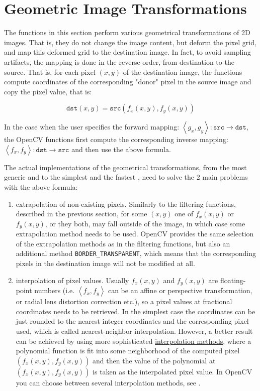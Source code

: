 \section{Geometric Image Transformations}

The functions in this section perform various geometrical transformations of 2D images. That is, they do not change the image content, but deform the pixel grid, and map this deformed grid to the destination image. In fact, to avoid sampling artifacts, the mapping is done in the reverse order, from destination to the source. That is, for each pixel $(x, y)$ of the destination image, the functions compute coordinates of the corresponding "donor" pixel in the source image and copy the pixel value, that is:

\[\texttt{dst}(x,y)=\texttt{src}(f_x(x,y), f_y(x,y))\]

In the case when the user specifies the forward mapping: $\left<g_x, g_y\right>: \texttt{src} \rightarrow \texttt{dst}$, the OpenCV functions first compute the corresponding inverse mapping: $\left<f_x, f_y\right>: \texttt{dst} \rightarrow \texttt{src}$ and then use the above formula.

The actual implementations of the geometrical transformations, from the most generic  and to the simplest and the fastest , need to solve the 2 main problems with the above formula:
\begin{enumerate}
    \item extrapolation of non-existing pixels. Similarly to the filtering functions, described in the previous section, for some $(x,y)$ one of $f_x(x,y)$ or $f_y(x,y)$, or they both, may fall outside of the image, in which case some extrapolation method needs to be used. OpenCV provides the same selection of the extrapolation methods as in the filtering functions, but also an additional method \texttt{BORDER\_TRANSPARENT}, which means that the corresponding pixels in the destination image will not be modified at all.
    \item interpolation of pixel values. Usually $f_x(x,y)$ and $f_y(x,y)$ are floating-point numbers (i.e. $\left<f_x, f_y\right>$ can be an affine or perspective transformation, or radial lens distortion correction etc.), so a pixel values at fractional coordinates needs to be retrieved. In the simplest case the coordinates can be just rounded to the nearest integer coordinates and the corresponding pixel used, which is called nearest-neighbor interpolation. However, a better result can be achieved by using more sophisticated \href{http://en.wikipedia.org/wiki/Multivariate_interpolation}{interpolation methods}, where a polynomial function is fit into some neighborhood of the computed pixel $(f_x(x,y), f_y(x,y))$ and then the value of the polynomial at $(f_x(x,y), f_y(x,y))$ is taken as the interpolated pixel value. In OpenCV you can choose between several interpolation methods, see . 
\end{enumerate}

